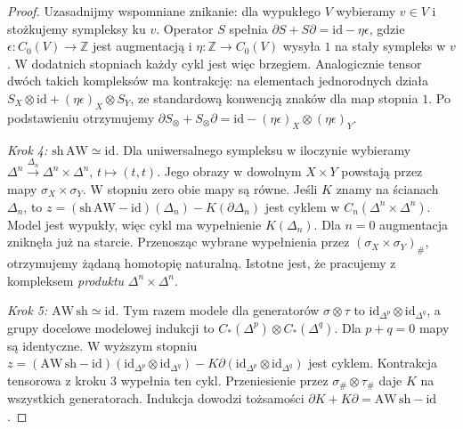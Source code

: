 \documentclass[11pt,a4paper,oneside]{report}
\newcommand{\Z}{\mathbb{Z}}
\newcommand{\id}{\mathrm{id}}
\theoremstyle{plain}
\theoremstyle{definition}
\theoremstyle{remark}
\begin{document}
\begin{proof}
Uzasadnijmy wspomniane znikanie: dla wypukłego $V$ wybieramy
$v\in V$ i stożkujemy sympleksy ku $v$. Operator $S$ spełnia
$\partial S+S\partial=\id-\eta\epsilon$, gdzie
$\epsilon:C_0(V)\to\Z$ jest augmentacją i
$\eta:\Z\to C_0(V)$ wysyła $1$ na stały sympleks w $v$.
W dodatnich stopniach każdy cykl jest więc brzegiem.
Analogicznie tensor dwóch takich kompleksów ma kontrakcję:
na elementach jednorodnych działa
$S_X\otimes\id+(\eta\epsilon)_X\otimes S_Y$,
ze standardową konwencją znaków dla map stopnia $1$.
Po podstawieniu otrzymujemy
$\partial S_{\otimes}+S_{\otimes}\partial
=\id-(\eta\epsilon)_X\otimes(\eta\epsilon)_Y$.

\emph{Krok 4: $\mathrm{sh}\,\mathrm{AW}\simeq\id$.}
Dla uniwersalnego sympleksu w iloczynie wybieramy
$\Delta^n\xrightarrow{\Delta_n}\Delta^n\times\Delta^n$,
$t\mapsto(t,t)$. Jego obrazy w dowolnym $X\times Y$
powstają przez mapy $\sigma_X\times\sigma_Y$.
W stopniu zero obie mapy są równe. Jeśli $K$ znamy na
ścianach $\Delta_n$, to
$z=(\mathrm{sh}\,\mathrm{AW}-\id)(\Delta_n)-K(\partial\Delta_n)$
jest cyklem w $C_n(\Delta^n\times\Delta^n)$. Model jest
wypukły, więc cykl ma wypełnienie $K(\Delta_n)$.
Dla $n=0$ augmentacja zniknęła już na starcie.
Przenosząc wybrane wypełnienia przez
$(\sigma_X\times\sigma_Y)_\#$, otrzymujemy żądaną
homotopię naturalną. Istotne jest, że pracujemy z
kompleksem \emph{produktu} $\Delta^n\times\Delta^n$.

\emph{Krok 5: $\mathrm{AW}\,\mathrm{sh}\simeq\id$.}
Tym razem modele dla generatorów $\sigma\otimes\tau$ to
$\id_{\Delta^p}\otimes\id_{\Delta^q}$, a grupy docelowe
modelowej indukcji to
$C_*(\Delta^p)\otimes C_*(\Delta^q)$.
Dla $p+q=0$ mapy są identyczne. W wyższym stopniu
$z=(\mathrm{AW}\,\mathrm{sh}-\id)
(\id_{\Delta^p}\otimes\id_{\Delta^q})-K\partial
(\id_{\Delta^p}\otimes\id_{\Delta^q})$ jest cyklem.
Kontrakcja tensorowa z kroku 3 wypełnia ten cykl.
Przeniesienie przez $\sigma_\#\otimes\tau_\#$ daje $K$
na wszystkich generatorach. Indukcja dowodzi tożsamości
$\partial K+K\partial=\mathrm{AW}\,\mathrm{sh}-\id$.
\end{proof}
\end{document}
